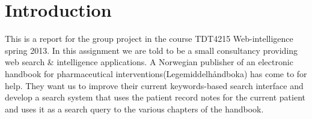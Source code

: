 \section{Introduction}
\label{sec:introduction}

This is a report for the group project in the course TDT4215 Web-intelligence spring 2013. In this assignment we are told to be a small consultancy providing web search \& intelligence applications. A Norwegian publisher of an electronic handbook for pharmaceutical interventions(Legemiddelhåndboka) has come to for help. They want us to improve their current keywords-based search interface and develop a search system that uses the patient record notes for the current patient and uses it as a search query to the various chapters of the handbook.
